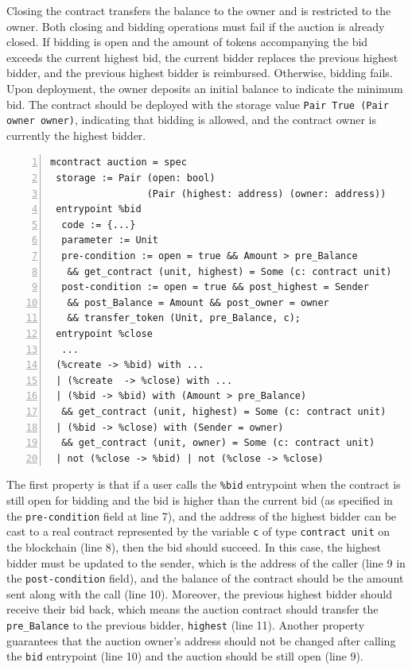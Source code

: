 \documentclass[runningheads]{llncs}
\begin{document}
Closing the contract transfers the balance to the owner and is restricted to the owner. Both closing and bidding operations must fail if the auction is already closed. If bidding is open and the amount of tokens accompanying the bid exceeds the current highest bid, the current bidder replaces the previous highest bidder, and the previous highest bidder is reimbursed. Otherwise, bidding fails. Upon deployment, the owner deposits an initial balance to indicate the minimum bid. The contract should be deployed with the storage value \lstinline|Pair True (Pair owner owner)|, indicating that bidding is allowed, and the contract owner is currently the highest bidder.
\begin{lstlisting}[float=tp,captionpos=b,caption={Auction contract specification},label={lst:auction-contract-specification1},numbers=left]
mcontract auction = spec 
 storage := Pair (open: bool) 
                 (Pair (highest: address) (owner: address))
 entrypoint %bid
  code := {...}
  parameter := Unit 
  pre-condition := open = true && Amount > pre_Balance
   && get_contract (unit, highest) = Some (c: contract unit)
  post-condition := open = true && post_highest = Sender 
   && post_Balance = Amount && post_owner = owner 
   && transfer_token (Unit, pre_Balance, c);
 entrypoint %close
  ...
 (%create -> %bid) with ...
 | (%create  -> %close) with ...
 | (%bid -> %bid) with (Amount > pre_Balance) 
  && get_contract (unit, highest) = Some (c: contract unit)
 | (%bid -> %close) with (Sender = owner) 
  && get_contract (unit, owner) = Some (c: contract unit)
 | not (%close -> %bid) | not (%close -> %close)
\end{lstlisting}

The first property is that if a user calls the \lstinline|%bid| entrypoint when the contract is still open for bidding and the bid is higher than the current bid (as specified in the \lstinline|pre-condition| field at line 7), and the address of the highest bidder can be cast to a real contract represented by the variable \lstinline|c| of type \lstinline|contract unit| on the blockchain (line 8), then the bid should succeed. In this case, the highest bidder must be updated to the sender, which is the address of the caller (line 9 in the \lstinline|post-condition| field), and the balance of the contract should be the amount sent along with the call (line 10). Moreover, the previous highest bidder should receive their bid back, which means the auction contract should transfer the \lstinline|pre_Balance| to the previous bidder, \lstinline|highest| (line 11). Another property guarantees that the auction owner's address should not be changed after calling the \lstinline/bid/ entrypoint (line 10) and the auction should be still open (line 9). 
\end{document}
